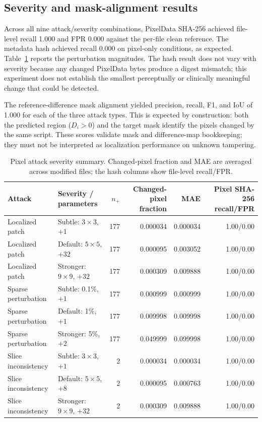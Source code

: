 \documentclass[journal]{IEEEtran}
\begin{document}
  \subsection{Severity and mask-alignment results}
  Across all nine attack/severity combinations, PixelData SHA-256 achieved file-level recall 1.000 and FPR 0.000 against the per-file clean reference. The metadata hash achieved recall 0.000 on pixel-only conditions, as expected. Table~\ref{tab:severity} reports the perturbation magnitudes. The hash result does not vary with severity because any changed PixelData bytes produce a digest mismatch; this experiment does not establish the smallest perceptually or clinically meaningful change that could be detected.
  
  The reference-difference mask alignment yielded precision, recall, F1, and IoU of 1.000 for each of the three attack types. This is expected by construction: both the predicted region ($D_i>0$) and the target mask identify the pixels changed by the same script. These scores validate mask and difference-map bookkeeping; they must not be interpreted as localization performance on unknown tampering.
  
  \begin{table}[t]
  \caption{Pixel attack severity summary. Changed-pixel fraction and MAE are averaged across modified files; the hash columns show file-level recall/FPR.}
  \label{tab:severity}
  \centering\scriptsize
  \begin{tabular}{llrrrr}
  \toprule
  Attack & Severity / parameters & $n_+$ & Changed-pixel fraction & MAE & Pixel SHA-256 recall/FPR \\
  \midrule
  Localized patch & Subtle: $3\times3$, $+1$ & 177 & 0.000034 & 0.000034 & 1.00/0.00 \\
  Localized patch & Default: $5\times5$, $+32$ & 177 & 0.000095 & 0.003052 & 1.00/0.00 \\
  Localized patch & Stronger: $9\times9$, $+32$ & 177 & 0.000309 & 0.009888 & 1.00/0.00 \\
  Sparse perturbation & Subtle: 0.1\%, $+1$ & 177 & 0.000999 & 0.000999 & 1.00/0.00 \\
  Sparse perturbation & Default: 1\%, $+1$ & 177 & 0.009998 & 0.009998 & 1.00/0.00 \\
  Sparse perturbation & Stronger: 5\%, $+2$ & 177 & 0.049999 & 0.099998 & 1.00/0.00 \\
  Slice inconsistency & Subtle: $3\times3$, $+1$ & 2 & 0.000034 & 0.000034 & 1.00/0.00 \\
  Slice inconsistency & Default: $5\times5$, $+8$ & 2 & 0.000095 & 0.000763 & 1.00/0.00 \\
  Slice inconsistency & Stronger: $9\times9$, $+32$ & 2 & 0.000309 & 0.009888 & 1.00/0.00 \\
  \bottomrule
  \end{tabular}
  \end{table}
  
\end{document}
